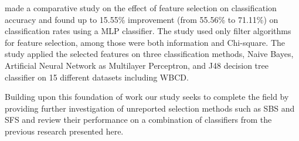 \textcite{karabulut2012} made a comparative study on the effect of feature selection on classification accuracy and found up to 15.55\% improvement (from 55.56\% to 71.11\%) on classification rates using a MLP classifier. The study used only filter algorithms for feature selection, among those were both information and Chi-square. The study applied the selected features on three classification methods, Naive Bayes, Artificial Neural Network as Multilayer Perceptron, and J48 decision tree classifier on 15 different datasets including WBCD.

Building upon this foundation of work our study seeks to complete the field by providing further investigation of unreported selection methods such as SBS and SFS and review their performance on a combination of classifiers from the previous research presented here.
